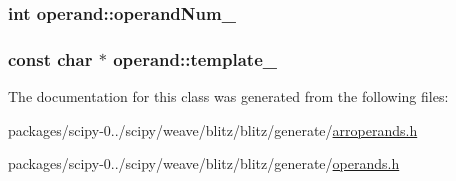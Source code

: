 \subsubsection[{operand\+Num\+\_\+}]{\setlength{\rightskip}{0pt plus 5cm}int operand\+::operand\+Num\+\_\+\hspace{0.3cm}{\ttfamily [protected]}}\label{classoperand_a724de2cd14c1efd74b177bbee742caab}
\hypertarget{classoperand_a70a844aaf41245aab1552320183a803f}{}
\subsubsection[{template\+\_\+}]{\setlength{\rightskip}{0pt plus 5cm}const char $\ast$ operand\+::template\+\_\+\hspace{0.3cm}{\ttfamily [protected]}}\label{classoperand_a70a844aaf41245aab1552320183a803f}


The documentation for this class was generated from the following files\+:\begin{DoxyCompactItemize}
\item 
packages/scipy-\/0../scipy/weave/blitz/blitz/generate/\hyperlink{arroperands_8h}{arroperands.\+h}\item 
packages/scipy-\/0../scipy/weave/blitz/blitz/generate/\hyperlink{operands_8h}{operands.\+h}\end{DoxyCompactItemize}

